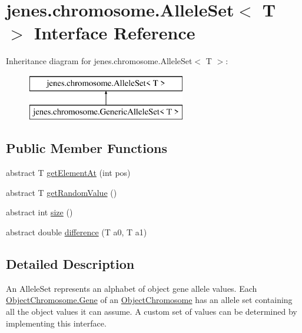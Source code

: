 \hypertarget{interfacejenes_1_1chromosome_1_1_allele_set_3_01_t_01_4}{\section{jenes.\-chromosome.\-Allele\-Set$<$ T $>$ Interface Reference}
\label{interfacejenes_1_1chromosome_1_1_allele_set_3_01_t_01_4}
}
Inheritance diagram for jenes.\-chromosome.\-Allele\-Set$<$ T $>$\-:\begin{figure}[H]
\begin{center}
\leavevmode
\includegraphics[height=2.000000cm]{interfacejenes_1_1chromosome_1_1_allele_set_3_01_t_01_4}
\end{center}
\end{figure}
\subsection*{Public Member Functions}
\begin{DoxyCompactItemize}
\item 
abstract T \hyperlink{interfacejenes_1_1chromosome_1_1_allele_set_3_01_t_01_4_a10625403643dc57a5c655a92a49aa644}{get\-Element\-At} (int pos)
\item 
abstract T \hyperlink{interfacejenes_1_1chromosome_1_1_allele_set_3_01_t_01_4_ac09d409c55d941892df658d21b3d4bff}{get\-Random\-Value} ()
\item 
abstract int \hyperlink{interfacejenes_1_1chromosome_1_1_allele_set_3_01_t_01_4_a3acbb10df92ebafc589d5d8546949f2f}{size} ()
\item 
abstract double \hyperlink{interfacejenes_1_1chromosome_1_1_allele_set_3_01_t_01_4_a74ab0cb120fcfdee8e878727d6c50815}{difference} (T a0, T a1)
\end{DoxyCompactItemize}


\subsection{Detailed Description}
An Allele\-Set represents an alphabet of object gene allele values. Each \hyperlink{}{Object\-Chromosome.\-Gene} of an \hyperlink{classjenes_1_1chromosome_1_1_object_chromosome}{Object\-Chromosome} has an allele set containing all the object values it can assume. A custom set of values can be determined by implementing this interface.


